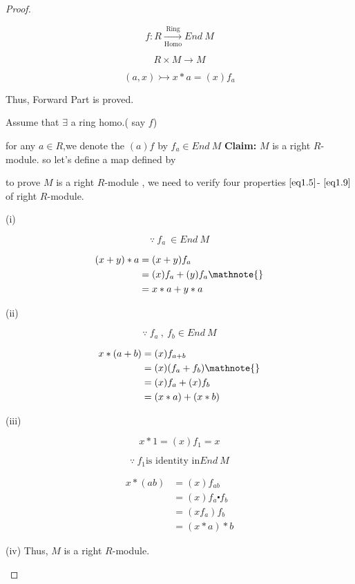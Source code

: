 \begin{proof}
\begin{description}
\begin{description}
\[
f: R\xrightarrow[\text{Homo}]{\text{Ring}} End \ M 
\]

\[
R\times M \longrightarrow M 
\]

\[
(a , x ) \rightarrowtail x*a = (x)f_a 
\]

\end{description}
\bigskip
Thus, Forward Part is proved.\newline\bigskip
\item[(Converse Part)]
\bigskip
Assume that $\exists$ a ring homo.( say $f$)

for any $a \in R$,we denote the $(a)f$ by $f_a \in End \ M$\newline
\textbf{Claim:} $M$ is a right $R$-module.\newline
so let's define a map
 defined by

to prove $M$ is a right $R$-module , we need to verify four properties $\eqref{eq1.5}$- $\eqref{eq1.9}$ of right $R$-module.

\begin{description}
	\item[(i)]

\end{description}

\[
\because\ f_a \ \in End \ M 
\]

\begin{align*}
(x+y)*a &= (x+y)f_a \\& = (x)f_a +(y)f_a \mathnote{}\\& = x*a + y*a

\end{align*}
   \item{(ii)}

\[
\because\ f_a \ , \ f_b \in End \ M 
\]

\begin{align*}
   x*(a+b) &= (x)f_{a+b} \\ &= (x)(f_a + f_b) \mathnote{} \\&=(x)f_a + (x)f_b
 \\ &= (x*a) + (x*b)   
\end{align*}
 \item{(iii)}

\[
x*1 = (x)f_1  = x
\]

\[
\because\ f_1 \text{is identity in} End \ M 
\]

\begin{align*}
 x*(ab) &= (x)f_{ab} \\ & = (x)f_a\centerdot f_b \\&=(x f_a)f_b \\&= (x*a)*b
 
\end{align*}
 \item{(iv)}
 \marginnote{}
Thus, $ M $ is a right $R$-module.

\end{description}

\end{proof}

